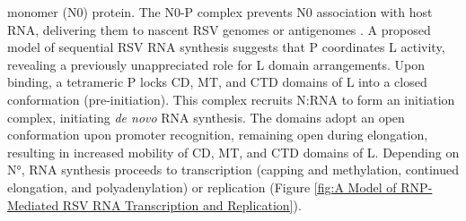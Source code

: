monomer (N0) protein. The N0-P complex prevents N0 association with host RNA, delivering them to nascent RSV genomes or antigenomes \cite{Castagne2004BiochemicalDomain, Galloux2015IdentificationNucleoprotein}. A proposed model of sequential RSV RNA synthesis suggests that P coordinates L activity, revealing a previously unappreciated role for L domain arrangements. Upon binding, a tetrameric P locks CD, MT, and CTD domains of L into a closed conformation (pre-initiation). This complex recruits N:RNA to form an initiation complex, initiating \textit{de novo} RNA synthesis. The domains adopt an open conformation upon promoter recognition, remaining open during elongation, resulting in increased mobility of CD, MT, and CTD domains of L. Depending on N°, RNA synthesis proceeds to transcription (capping and methylation, continued elongation, and polyadenylation) or replication \cite{Cao2020Cryo-EMPolymerase} (Figure \ref{fig:A Model of RNP-Mediated RSV RNA Transcription and Replication}).

